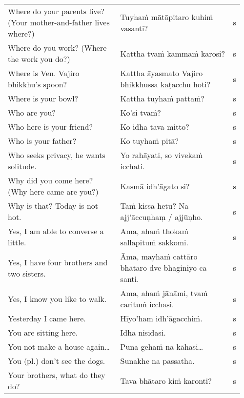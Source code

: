 \documentclass[a5paper]{memoir}
\begin{document}
\begin{longtable}{L{0.48\linewidth} L{0.48\linewidth} H}
Where do your parents live? (Your mother-and-father lives where?) & Tuyhaṁ mātāpitaro kuhiṁ vasanti? & s\\[0pt]
Where do you work? (Where the work you do?) & Kattha tvaṁ kammaṁ karosi? & s\\[0pt]
Where is Ven. Vajiro bhikkhu's spoon? & Kattha āyasmato Vajiro bhikkhussa kaṭacchu hoti? & s\\[0pt]
Where is your bowl? & Kattha tuyhaṁ pattaṁ? & s\\[0pt]
Who are you? & Ko'si tvaṁ? & s\\[0pt]
Who here is your friend? & Ko idha tava mitto? & s\\[0pt]
Who is your father? & Ko tuyhaṁ pitā? & s\\[0pt]
Who seeks privacy, he wants solitude. & Yo rahāyati, so vivekaṁ icchati. & s\\[0pt]
Why did you come here? (Why here came are you?) & Kasmā idh'āgato si? & s\\[0pt]
Why is that? Today is not hot. & Taṁ kissa hetu? Na ajj'āccuṇhaṃ / ajjūṇho. & s\\[0pt]
Yes, I am able to converse a little. & Āma, ahaṁ thokaṁ sallapituṁ sakkomi. & s\\[0pt]
Yes, I have four brothers and two sisters. & Āma, mayhaṁ cattāro bhātaro dve bhaginiyo ca santi. & s\\[0pt]
Yes, I know you like to walk. & Āma, ahaṁ jānāmi, tvaṁ carituṁ icchasi. & s\\[0pt]
Yesterday I came here. & Hīyo'ham idh'āgacchiṁ. & s\\[0pt]
You are sitting here. & Idha nisīdasi. & s\\[0pt]
You not make a house again\ldots{} & Puna gehaṁ na kāhasi\ldots{} & s\\[0pt]
You (pl.) don't see the dogs. & Sunakhe na passatha. & s\\[0pt]
Your brothers, what do they do? & Tava bhātaro kiṁ karonti? & s\\[0pt]
\end{longtable}
\end{document}
